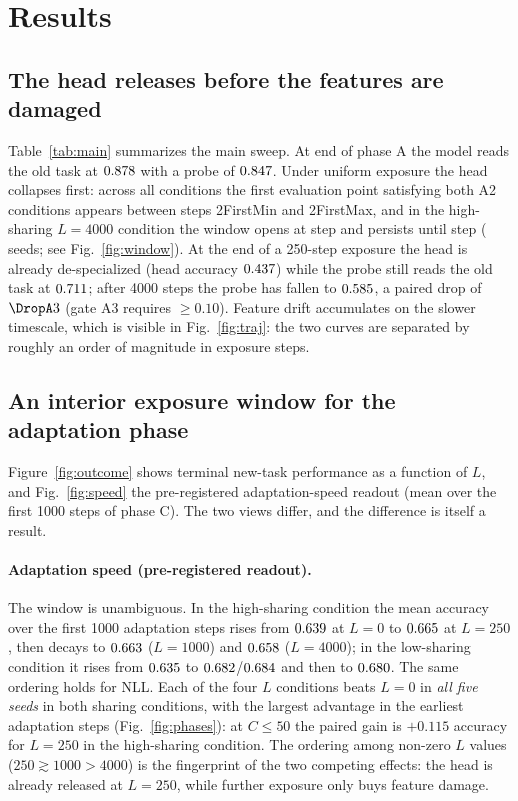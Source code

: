 \documentclass[review,12pt]{elsarticle}
\begin{document}
\section{Results}
\label{sec:results}

\subsection{The head releases before the features are damaged}
\label{sec:r-separation}
Table~\ref{tab:main} summarizes the main sweep. At end of phase A the model
reads the old task at $0.878$ with a probe of $0.847$. Under uniform
exposure the head collapses first: across all conditions the first evaluation
point satisfying both A2 conditions appears between steps \A2FirstMin{} and
\A2FirstMax{}, and in the high-sharing $L{=}4000$ condition the window opens
at step \WinFirst{} and persists until step \WinLast{} (\WinSeeds{} seeds;
see Fig.~\ref{fig:window}). At the end of a
250-step exposure the head is already de-specialized
(head accuracy $0.437$) while the probe still reads the old task at
$0.711$; after 4000 steps the probe has fallen to $0.585$,
a paired drop of $\DropA3$ (gate A3 requires $\ge0.10$). Feature drift
accumulates on the slower timescale, which is visible in
Fig.~\ref{fig:traj}: the two curves are separated by roughly an order of
magnitude in exposure steps.



\subsection{An interior exposure window for the adaptation phase}
\label{sec:r-window}
Figure~\ref{fig:outcome} shows terminal new-task performance as a function of
$L$, and Fig.~\ref{fig:speed} the pre-registered adaptation-speed readout
(mean over the first 1000 steps of phase C). The two views differ, and the
difference is itself a result.

\paragraph{Adaptation speed (pre-registered readout).}
The window is unambiguous. In the high-sharing condition the mean accuracy
over the first 1000 adaptation steps rises from $0.639$ at $L{=}0$ to
$0.665$ at $L{=}250$, then decays to $0.663$ ($L{=}1000$) and
$0.658$ ($L{=}4000$); in the low-sharing condition it rises from
$0.635$ to $0.682$/$0.684$ and then to $0.680$.
The same ordering holds for NLL. Each of the four $L$ conditions beats
$L{=}0$ in \emph{all five seeds} in both sharing conditions, with the largest
advantage in the earliest adaptation steps (Fig.~\ref{fig:phases}): at
$C\le50$ the paired gain is $+0.115$ accuracy for $L{=}250$ in the
high-sharing condition. The ordering among non-zero $L$ values
($250 \gtrsim 1000 > 4000$) is the fingerprint of the two competing effects:
the head is already released at $L{=}250$, while further exposure only buys
feature damage.
\end{document}
